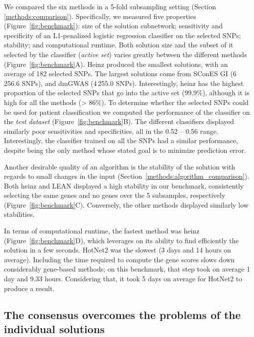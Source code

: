 \documentclass[twocolumn, 11pt]{article}
\begin{document}
We compared the six methods in a 5-fold subsampling setting (Section \ref{methods:comparison}). Specifically, we measured five properties (Figure~\ref{fig:benchmark}): size of the solution subnetwork; sensitivity and specificity of an L1-penalized logistic regression classifier on the selected SNPs; stability; and computational runtime. Both solution size and the subset of it selected by the classifier (\emph{active set}) varies greatly between the different methods (Figure~\ref{fig:benchmark}A). Heinz produced the smallest solutions, with an average of 182 selected SNPs. The largest solutions come from SConES GI (6\,256.6 SNPs), and dmGWAS (4\,255.0 SNPs). Interestingly, heinz has the highest proportion of the selected SNPs that go into the active set (99.9\%), although it is  high for all the methods (> 86\%). To determine whether the selected SNPs could be used for patient classification we computed the performance of the classifier on the \emph{test dataset} (Figure~\ref{fig:benchmark}B). The different classifiers displayed similarly poor sensitivities and specificities, all in the 0.52 -- 0.56 range. Interestingly, the classifier trained on all the SNPs had a similar performance, despite being the only method whose stated goal is to minimize prediction error.

Another desirable quality of an algorithm is the stability of the solution with regards to small changes in the input (Section~\ref{methods:algorithm_comparison}). Both heinz and LEAN displayed a high stability in our benchmark, consistently selecting the same genes and no genes over the 5 subsamples, respectively (Figure~\ref{fig:benchmark}C). Conversely, the other methods displayed similarly low stabilities. 

In terms of computational runtime, the fastest method was heinz (Figure~\ref{fig:benchmark}D), which leverages on its ability to find efficiently the solution in a few seconds. HotNet2 was the slowest (3 days and 14 hours on average). Including the time required to compute the gene scores slows down considerably gene-based methods; on this benchmark, that step took on average 1 day and 9.33 hours. Considering that, it took 5 days on average for HotNet2 to produce a result.

\subsection{The consensus overcomes the problems of the individual solutions}
\label{results:drawbacks}
\end{document}
